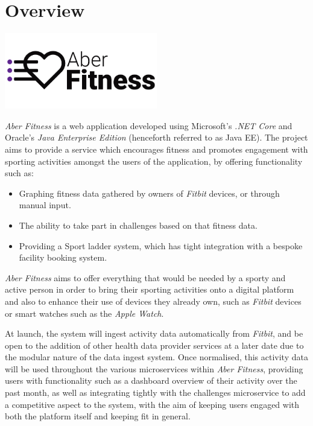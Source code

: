 \chapter{Overview}

\begin{center}
	\includegraphics[width=0.5\textwidth]{Images/aberfitness.png}
\end{center}

\par
\textit{Aber Fitness} is a web application developed using Microsoft's \textit{.NET Core} and Oracle's \textit{Java Enterprise Edition} (henceforth referred to as Java EE). The project aims to provide a service which encourages fitness and promotes engagement with sporting activities amongst the users of the application, by offering functionality such as:

\begin{itemize}
	\item Graphing fitness data gathered by owners of \textit{Fitbit} devices, or through manual input.
	\item The ability to take part in challenges based on that fitness data.
	\item Providing a Sport ladder system, which has tight integration with a bespoke facility booking system.
\end{itemize}

\textit{Aber Fitness} aims to offer everything that would be needed by a sporty and active person in order to bring their sporting activities onto a digital platform and also to enhance their use of devices they already own, such as \textit{Fitbit} devices or smart watches such as the \textit{Apple Watch}.

\par
At launch, the system will ingest activity data automatically from \textit{Fitbit}, and be open to the addition of other health data provider services at a later date due to the modular nature of the data ingest system. Once normalised, this activity data will be used throughout the various microservices within \textit{Aber Fitness}, providing users with functionality such as a dashboard overview of their activity over the past month, as well as integrating tightly with the challenges microservice to add a competitive aspect to the system, with the aim of keeping users engaged with both the platform itself and keeping fit in general.

